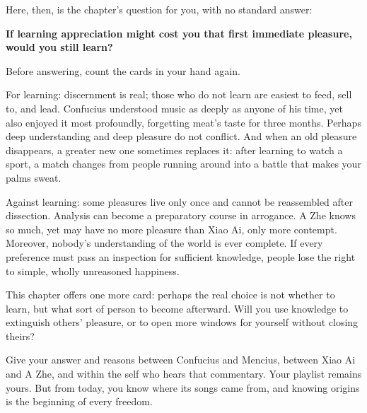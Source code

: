 Here, then, is the chapter's question for you, with no standard answer:

\textbf{If learning appreciation might cost you that first immediate pleasure, would you still learn?}

Before answering, count the cards in your hand again.

For learning: discernment is real; those who do not learn are easiest to feed, sell to, and lead. Confucius understood music as deeply as anyone of his time, yet also enjoyed it most profoundly, forgetting meat's taste for three months. Perhaps deep understanding and deep pleasure do not conflict. And when an old pleasure disappears, a greater new one sometimes replaces it: after learning to watch a sport, a match changes from people running around into a battle that makes your palms sweat.

Against learning: some pleasures live only once and cannot be reassembled after dissection. Analysis can become a preparatory course in arrogance. A Zhe knows so much, yet may have no more pleasure than Xiao Ai, only more contempt. Moreover, nobody's understanding of the world is ever complete. If every preference must pass an inspection for sufficient knowledge, people lose the right to simple, wholly unreasoned happiness.

This chapter offers one more card: perhaps the real choice is not whether to learn, but what sort of person to become afterward. Will you use knowledge to extinguish others' pleasure, or to open more windows for yourself without closing theirs?

Give your answer and reasons between Confucius and Mencius, between Xiao Ai and A Zhe, and within the self who hears that commentary. Your playlist remains yours. But from today, you know where its songs came from, and knowing origins is the beginning of every freedom.
